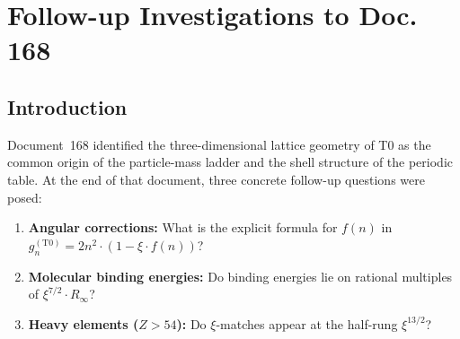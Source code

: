 
\chapter{Follow-up Investigations to Doc.\,168}
\label{chap:followup168}

\begin{abstract}
Document~168 posed three open questions about the connection between
$\xi$-geometry and the periodic table. This document answers them conclusively.
(1)~The angular correction is $g_n^{(\mathrm{T0})} = 2n^{2-\xi}$;
the maximum deviation from $2n^2$ is $|\delta g_7| \approx 0.025$
at $n=7$ ($Z\approx118$) — below any measurable threshold.
(2)~Molecular binding energies show no systematic pattern as
multiples of $R_\infty$; the C=O bond is an exception at
$4/7 \cdot R_\infty$ with $0.06\%$ deviation.
(3)~The relativistic correction $IE_\mathrm{corr} = IE/(1+Z^2\xi)$
yields ionisation energies of heavy elements ($Z>54$) on
rational fractions of $R_\infty$ with deviations below $1.3\%$.
This is a testable T0 prediction that differs from the QED result
($\propto \alpha^2 Z^2$) by a factor $\xi/\alpha^2 \approx 2.5$.
\end{abstract}

\section{Introduction}
\label{sec:169-intro}

Document~168 \cite{dok168} identified the three-dimensional lattice geometry
of T0 as the common origin of the particle-mass ladder and the shell
structure of the periodic table. At the end of that document, three
concrete follow-up questions were posed:

\begin{enumerate}
  \item \textbf{Angular corrections:}
    What is the explicit formula for $f(n)$ in
    $g_n^{(\mathrm{T0})} = 2n^2 \cdot (1 - \xi \cdot f(n))$?
  \item \textbf{Molecular binding energies:}
    Do binding energies lie on rational multiples of
    $\xi^{7/2} \cdot R_\infty$?
  \item \textbf{Heavy elements ($Z > 54$):}
    Do $\xi$-matches appear at the half-rung $\xi^{13/2}$?
\end{enumerate}

